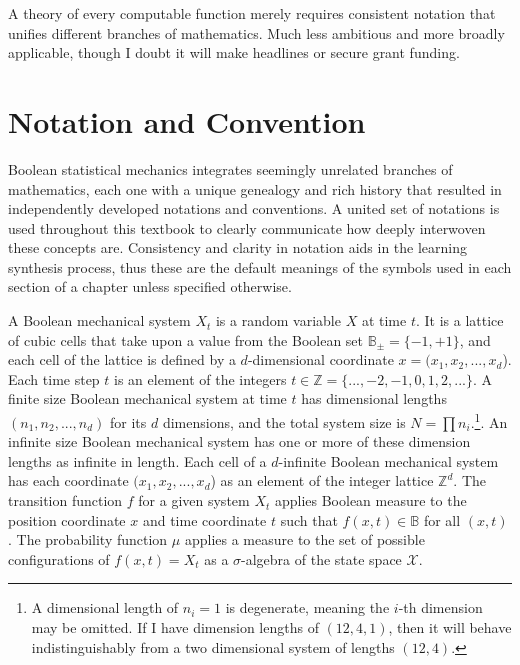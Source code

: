 \documentclass[10pt, a5paper, twoside, openright]{memoir}
\begin{document}
A theory of every computable function merely requires consistent notation that unifies different branches of mathematics. Much less ambitious and more broadly applicable, though I doubt it will make headlines or secure grant funding.

\section{Notation and Convention}
Boolean statistical mechanics integrates seemingly unrelated branches of mathematics, each one with a unique genealogy and rich history that resulted in independently developed notations and conventions. A united set of notations is used throughout this textbook to clearly communicate how deeply interwoven these concepts are. Consistency and clarity in notation aids in the learning synthesis process, thus these are the default meanings of the symbols used in each section of a chapter unless specified otherwise.

A Boolean mechanical system $X_t$ is a random variable $X$ at time $t$. It is a lattice of cubic cells that take upon a value from the Boolean set $\mathbb B_\pm = \{-1, +1\}$, and each cell of the lattice is defined by a $d$-dimensional coordinate $x=(x_1,x_2,...,x_d$). Each time step $t$ is an element of the integers $t \in \mathbb Z = \{...,-2,-1,0,1,2,...\}$. A finite size Boolean mechanical system at time $t$ has dimensional lengths $(n_1, n_2,...,n_d)$ for its $d$ dimensions, and the total system size is $N = \prod n_i$.\footnote{A dimensional length of $n_i = 1$ is degenerate, meaning the $i$-th dimension may be omitted. If I have dimension lengths of $(12, 4, 1)$, then it will behave indistinguishably from a two dimensional system of lengths $(12, 4)$.}. An infinite size Boolean mechanical system has one or more of these dimension lengths as infinite in length. Each cell of a $d$-infinite Boolean mechanical system has each coordinate $(x_1,x_2,...,x_d$) as an element of the integer lattice $\mathbb Z^d$. The transition function $f$ for a given system $X_t$ applies Boolean measure to the position coordinate $x$ and time coordinate $t$ such that $f(x,t) \in \mathbb B$ for all $(x,t)$. The probability function $\mu$ applies a measure to the set of possible configurations of $f(x,t) = X_t$ as a $\sigma$-algebra of the state space $\mathcal X$.
\end{document}
